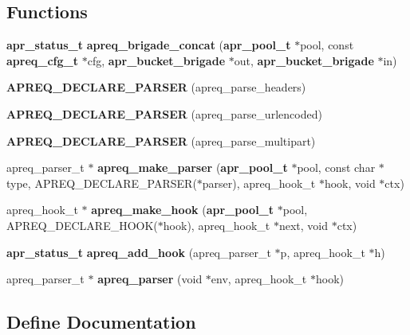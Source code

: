 \subsection*{Functions}
\begin{CompactItemize}
\item 
{\bf apr\_\-status\_\-t} {\bf apreq\_\-brigade\_\-concat} ({\bf apr\_\-pool\_\-t} $\ast$pool, const {\bf apreq\_\-cfg\_\-t} $\ast$cfg, {\bf apr\_\-bucket\_\-brigade} $\ast$out, {\bf apr\_\-bucket\_\-brigade} $\ast$in)\label{group__parsers_a3}

\item 
{\bf APREQ\_\-DECLARE\_\-PARSER} (apreq\_\-parse\_\-headers)\label{group__parsers_a4}

\item 
{\bf APREQ\_\-DECLARE\_\-PARSER} (apreq\_\-parse\_\-urlencoded)\label{group__parsers_a5}

\item 
{\bf APREQ\_\-DECLARE\_\-PARSER} (apreq\_\-parse\_\-multipart)\label{group__parsers_a6}

\item 
apreq\_\-parser\_\-t $\ast$ {\bf apreq\_\-make\_\-parser} ({\bf apr\_\-pool\_\-t} $\ast$pool, const char $\ast$type, APREQ\_\-DECLARE\_\-PARSER($\ast$parser), apreq\_\-hook\_\-t $\ast$hook, void $\ast$ctx)\label{group__parsers_a7}

\item 
apreq\_\-hook\_\-t $\ast$ {\bf apreq\_\-make\_\-hook} ({\bf apr\_\-pool\_\-t} $\ast$pool, APREQ\_\-DECLARE\_\-HOOK($\ast$hook), apreq\_\-hook\_\-t $\ast$next, void $\ast$ctx)\label{group__parsers_a8}

\item 
{\bf apr\_\-status\_\-t} {\bf apreq\_\-add\_\-hook} (apreq\_\-parser\_\-t $\ast$p, apreq\_\-hook\_\-t $\ast$h)\label{group__parsers_a9}

\item 
apreq\_\-parser\_\-t $\ast$ {\bf apreq\_\-parser} (void $\ast$env, apreq\_\-hook\_\-t $\ast$hook)\label{group__parsers_a10}

\end{CompactItemize}


\subsection{Define Documentation}
